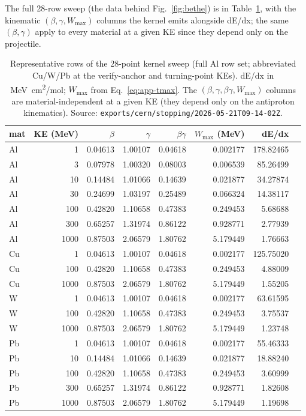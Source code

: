 The full 28-row sweep (the data behind Fig.~\ref{fig:bethe}) is in
Table~\ref{tab:app-bethe-sweep}, with the kinematic
$(\beta,\gamma,W_{\max})$ columns the kernel emits alongside dE/dx; the
same $(\beta,\gamma)$ apply to every material at a given KE since they
depend only on the projectile.

\begin{table}[h]
\centering
\scriptsize
\setlength{\tabcolsep}{4pt}
\begin{tabular}{@{}l r r r r r r r@{}}
\toprule
mat & KE (MeV) & $\beta$ & $\gamma$ & $\beta\gamma$ & $W_{\max}$ (MeV) & dE/dx \\
\midrule
Al & 1    & 0.04613 & 1.00107 & 0.04618 & 0.002177 & 178.82465 \\
Al & 3    & 0.07978 & 1.00320 & 0.08003 & 0.006539 & 85.26499 \\
Al & 10   & 0.14484 & 1.01066 & 0.14639 & 0.021877 & 34.27874 \\
Al & 30   & 0.24699 & 1.03197 & 0.25489 & 0.066324 & 14.38117 \\
Al & 100  & 0.42820 & 1.10658 & 0.47383 & 0.249453 & 5.68688 \\
Al & 300  & 0.65257 & 1.31974 & 0.86122 & 0.928771 & 2.77939 \\
Al & 1000 & 0.87503 & 2.06579 & 1.80762 & 5.179449 & 1.76663 \\
\midrule
Cu & 1    & 0.04613 & 1.00107 & 0.04618 & 0.002177 & 125.75020 \\
Cu & 100  & 0.42820 & 1.10658 & 0.47383 & 0.249453 & 4.88009 \\
Cu & 1000 & 0.87503 & 2.06579 & 1.80762 & 5.179449 & 1.55205 \\
\midrule
W  & 1    & 0.04613 & 1.00107 & 0.04618 & 0.002177 & 63.61595 \\
W  & 100  & 0.42820 & 1.10658 & 0.47383 & 0.249453 & 3.75537 \\
W  & 1000 & 0.87503 & 2.06579 & 1.80762 & 5.179449 & 1.23748 \\
\midrule
Pb & 1    & 0.04613 & 1.00107 & 0.04618 & 0.002177 & 55.46333 \\
Pb & 10   & 0.14484 & 1.01066 & 0.14639 & 0.021877 & 18.88240 \\
Pb & 100  & 0.42820 & 1.10658 & 0.47383 & 0.249453 & 3.60999 \\
Pb & 300  & 0.65257 & 1.31974 & 0.86122 & 0.928771 & 1.82608 \\
Pb & 1000 & 0.87503 & 2.06579 & 1.80762 & 5.179449 & 1.19698 \\
\bottomrule
\end{tabular}
\caption{Representative rows of the 28-point kernel sweep (full Al row
set; abbreviated Cu/W/Pb at the verify-anchor and turning-point KEs).
dE/dx in \si{MeV.cm^2/mol}; $W_{\max}$ from Eq.~\ref{eq:app-tmax}. The
$(\beta,\gamma,\beta\gamma,W_{\max})$ columns are material-independent at
a given KE (they depend only on the antiproton kinematics). Source:
\texttt{exports/cern/stopping/2026-05-21T09-14-02Z}.}
\label{tab:app-bethe-sweep}
\end{table}

